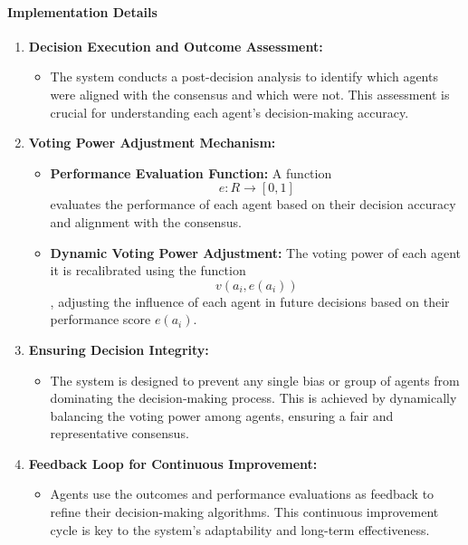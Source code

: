 \documentclass{article}
\begin{document}
\hypertarget{implementation-details}{%
\paragraph{Implementation Details}\label{implementation-details}}

\begin{enumerate}
\def\labelenumi{\arabic{enumi}.}
\item
  \textbf{Decision Execution and Outcome Assessment:}

  \begin{itemize}
  \item
    The system conducts a post-decision analysis to identify which
    agents were aligned with the consensus and which were not. This
    assessment is crucial for understanding each agent's decision-making
    accuracy.
  \end{itemize}
\item
  \textbf{Voting Power Adjustment Mechanism:}

  \begin{itemize}
  \item
    \textbf{Performance Evaluation Function:} A function
\[ e: R \rightarrow [0, 1] \] evaluates the performance of each
agent based on their decision accuracy and alignment with the
consensus.

  \item
    \textbf{Dynamic Voting Power Adjustment:} The voting power of each
    agent it is recalibrated using the function \[ v(a_i, e(a_i)) \],
    adjusting the influence of each agent in future decisions based on
    their performance score \( e(a_i) \).
  \end{itemize}
\item
  \textbf{Ensuring Decision Integrity:}

  \begin{itemize}
  \item
    The system is designed to prevent any single bias or group of agents
    from dominating the decision-making process. This is achieved by
    dynamically balancing the voting power among agents, ensuring a fair
    and representative consensus.
  \end{itemize}
\item
  \textbf{Feedback Loop for Continuous Improvement:}

  \begin{itemize}
  \item
    Agents use the outcomes and performance evaluations as feedback to
    refine their decision-making algorithms. This continuous improvement
    cycle is key to the system's adaptability and long-term
    effectiveness.
  \end{itemize}
\end{enumerate}
\end{document}

